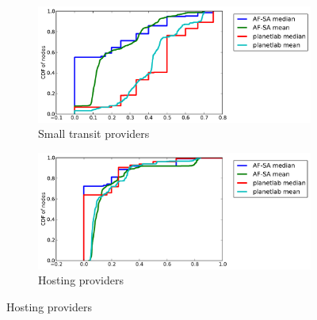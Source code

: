 \documentclass{sig-alternate-10pt}
\begin{document}
\begin{figure}
\begin{subfigure}[b]{0.45\textwidth}
\centering
    \includegraphics[width=1.0\linewidth]{figs/fractions_of_types-stp.pdf}
    \caption{Small transit providers}
\end{subfigure}
\begin{subfigure}[b]{0.45\textwidth}
\centering
    \includegraphics[width=1.0\linewidth]{figs/fractions_of_types-ahp.pdf}
    \caption{Hosting providers}
\end{subfigure}


\end{figure}
\end{document}

